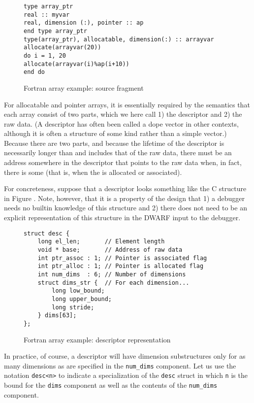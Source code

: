 \begin{figure}[here]
\begin{lstlisting}
type array_ptr
real :: myvar
real, dimension (:), pointer :: ap
end type array_ptr
type(array_ptr), allocatable, dimension(:) :: arrayvar
allocate(arrayvar(20))
do i = 1, 20
allocate(arrayvar(i)%ap(i+10))
end do
\end{lstlisting}
\caption{Fortran array example: source fragment} \label{fig:fortranarrayexamplesourcefragment}
\end{figure}

For allocatable and pointer arrays, it is essentially required
by the  semantics that each array consist of 
two
parts, which we here call 1) the descriptor and 2) the raw
data. (A descriptor has often been called a dope vector in
other contexts, although it is often a structure of some kind
rather than a simple vector.) Because there are two parts,
and because the lifetime of the descriptor is necessarily
longer than and includes that of the raw data, there must be
an address somewhere in the descriptor that points to the
raw data when, in fact, there is some (that is, when 
the  is allocated or associated).

For concreteness, suppose that a descriptor looks something
like the C structure in 
Figure .
Note, however, that it is
a property of the design that 1) a debugger needs no builtin
knowledge of this structure and 2) there does not need to
be an explicit representation of this structure in the DWARF
input to the debugger.

\begin{figure}[here]
\begin{lstlisting}
struct desc {
    long el_len;       // Element length
    void * base;       // Address of raw data
    int ptr_assoc : 1; // Pointer is associated flag
    int ptr_alloc : 1; // Pointer is allocated flag
    int num_dims  : 6; // Number of dimensions
    struct dims_str {  // For each dimension...  
        long low_bound;
        long upper_bound;
        long stride;
    } dims[63];
};
\end{lstlisting}
\caption{Fortran array example: descriptor representation}
\label{fig:fortranarrayexampledescriptorrepresentation}
\end{figure}


In practice, of course, a  descriptor will have
dimension substructures only for as many dimensions as are
specified in the \texttt{num\_dims} component. Let us use the notation
\texttt{desc\textless n\textgreater}   
to indicate a specialization of the \texttt{desc} struct in
which \texttt{n} is the bound for the \texttt{dims} component as well as the
contents of the \texttt{num\_dims} component.

